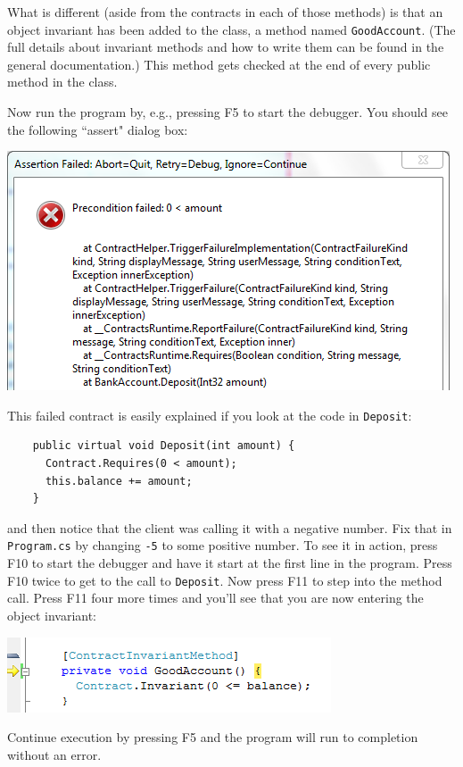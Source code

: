 \documentclass{article}
\newcommand{\code}[1]{\lstinline{#1}}
\begin{document}
What is different (aside from the contracts in each of those methods) is that an object invariant
has been added to the class, a method named \code{GoodAccount}.
(The full details about invariant methods and how to write them can be found in the general documentation.)
This method gets checked at the end of every public method in the class.

Now run the program by, e.g., pressing \textsf{F5} to start the debugger.
You should see the following ``assert" dialog box:
\begin{center}
  \includegraphics[width=1\columnwidth]{ex2.png}
\end{center}
This failed contract is easily explained if you look at the code in 
\code{Deposit}:
\begin{lstlisting}
    public virtual void Deposit(int amount) {
      Contract.Requires(0 < amount);
      this.balance += amount;
    }
\end{lstlisting}
and then notice that the client was calling it with a negative number.
Fix that in \code{Program.cs} by changing \code{-5} to some positive number.
To see it in action, press \textsf{F10} to start the debugger and have it start at the first line in
the program.
Press \textsf{F10} twice to get to the call to \code{Deposit}.
Now press \textsf{F11} to step into the method call.
Press \textsf{F11} four more times and you'll see that you are now entering the
object invariant:
\begin{center}
  \includegraphics[width=.8\columnwidth]{ex3.png}
\end{center}
Continue execution by pressing \textsf{F5} and the program will run to
completion without an error.
\end{document}
